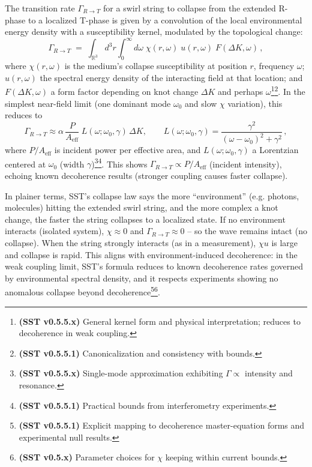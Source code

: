 \documentclass[reprint,aps,onecolumn,nofootinbib]{revtex4-2}
\begin{document}
    \begin{tcolorbox}[title=Theorem 8.1: R$\to$T Transition Dynamics (Collapse Rate)]
    The transition rate $\Gamma_{R\to T}$ for a swirl string to collapse from the extended R-phase to a localized T-phase is given by a convolution of the local environmental energy density with a susceptibility kernel, modulated by the topological change:
    \[
        \Gamma_{R\to T} \;=\; \int_{\mathbb{R}^3}\! d^3r \int_0^{\infty}\! d\omega\;\chi(r,\omega)\;u(r,\omega)\;F(\Delta K,\omega)\,,
    \]
    where $\chi(r,\omega)$ is the medium’s collapse susceptibility at position $r$, frequency $\omega$; $u(r,\omega)$ the spectral energy density of the interacting field at that location; and $F(\Delta K,\omega)$ a form factor depending on knot change $\Delta K$ and perhaps $\omega$\footnote{\textbf{(SST v0.5.5.x)} General kernel form and physical interpretation; reduces to decoherence in weak coupling.}\footnote{\textbf{(SST v0.5.5.1)} Canonicalization and consistency with bounds.}. In the simplest near-field limit (one dominant mode $\omega_0$ and slow $\chi$ variation), this reduces to
    \[
        \Gamma_{R\to T} \approx \alpha\, \frac{P}{A_{\text{eff}}}\; L(\omega; \omega_0,\gamma)\,\Delta K, \qquad
        L(\omega; \omega_0,\gamma) = \frac{\gamma^2}{(\omega-\omega_0)^2+\gamma^2}\,,
    \]
    where $P/A_{\text{eff}}$ is incident power per effective area, and $L(\omega; \omega_0,\gamma)$ a Lorentzian centered at $\omega_0$ (width $\gamma$)\footnote{\textbf{(SST v0.5.5.x)} Single-mode approximation exhibiting $\Gamma\propto$ intensity and resonance.}\footnote{\textbf{(SST v0.5.5.1)} Practical bounds from interferometry experiments.}. This shows $\Gamma_{R\to T} \propto P/A_{\text{eff}}$ (incident intensity), echoing known decoherence results (stronger coupling causes faster collapse).
    \end{tcolorbox}

    \noindent In plainer terms, SST’s collapse law says the more “environment” (e.g. photons, molecules) hitting the extended swirl string, and the more complex a knot change, the faster the string collapses to a localized state. If no environment interacts (isolated system), $\chi \approx 0$ and $\Gamma_{R\to T}\approx 0$ – so the wave remains intact (no collapse). When the string strongly interacts (as in a measurement), $\chi u$ is large and collapse is rapid. This aligns with environment-induced decoherence: in the weak coupling limit, SST’s formula reduces to known decoherence rates governed by environmental spectral density, and it respects experiments showing no anomalous collapse beyond decoherence\footnote{\textbf{(SST v0.5.5.1)} Explicit mapping to decoherence master-equation forms and experimental null results.}\footnote{\textbf{(SST v0.5.x)} Parameter choices for $\chi$ keeping within current bounds.}.
\end{document}
